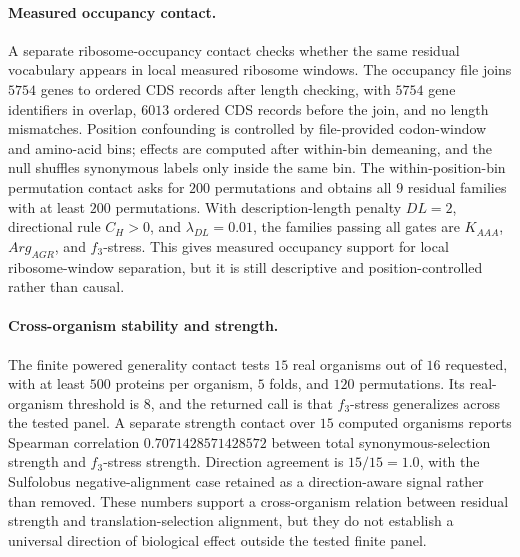 \paragraph{Measured occupancy contact.}
A separate ribosome-occupancy contact checks whether the same residual vocabulary appears in local measured ribosome windows.  The occupancy file joins $5754$ genes to ordered CDS records after length checking, with $5754$ gene identifiers in overlap, $6013$ ordered CDS records before the join, and no length mismatches.  Position confounding is controlled by file-provided codon-window and amino-acid bins; effects are computed after within-bin demeaning, and the null shuffles synonymous labels only inside the same bin.  The within-position-bin permutation contact asks for $200$ permutations and obtains all $9$ residual families with at least $200$ permutations.  With description-length penalty $DL=2$, directional rule $C_H>0$, and $\lambda_{DL}=0.01$, the families passing all gates are $K_{AAA}$, $Arg_{AGR}$, and $f_3$-stress.  This gives measured occupancy support for local ribosome-window separation, but it is still descriptive and position-controlled rather than causal.

\paragraph{Cross-organism stability and strength.}
The finite powered generality contact tests $15$ real organisms out of $16$ requested, with at least $500$ proteins per organism, $5$ folds, and $120$ permutations.  Its real-organism threshold is $8$, and the returned call is that $f_3$-stress generalizes across the tested panel.  A separate strength contact over $15$ computed organisms reports Spearman correlation $0.7071428571428572$ between total synonymous-selection strength and $f_3$-stress strength.  Direction agreement is $15/15=1.0$, with the Sulfolobus negative-alignment case retained as a direction-aware signal rather than removed.  These numbers support a cross-organism relation between residual strength and translation-selection alignment, but they do not establish a universal direction of biological effect outside the tested finite panel.


